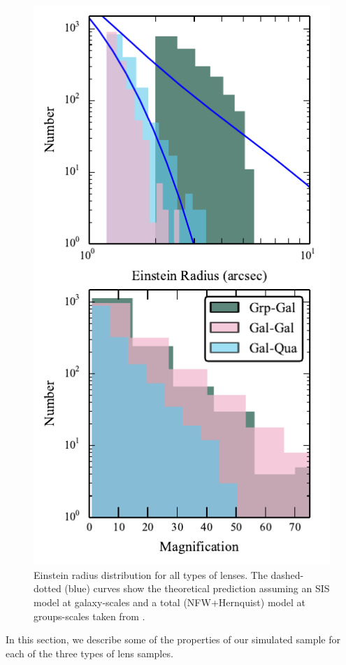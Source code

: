 \documentclass[useAMS,usenatbib,a4paper]{mn2e}
\begin{document}
\begin{figure}
\begin{center}
\includegraphics[scale=1.2]{sw-cfhtls-figs/distrib_remu.pdf}
\caption{ \label{fig:remudist}
Einstein radius distribution for all types of lenses. The dashed-dotted (blue)
curves show the theoretical prediction assuming an SIS model at galaxy-scales
and a total (NFW+Hernquist) model at groups-scales taken from \citep{More2012}.
}
\end{center}
\end{figure}

In this section, we describe some of the properties of our simulated sample for
each of the three types of lens samples.
\end{document}
